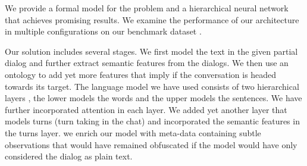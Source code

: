 
We provide a formal model for the problem and a hierarchical neural network 
that achieves promising results. 
We examine the performance of our architecture 
in multiple configurations on our benchmark dataset \cite{frames}. 

Our solution includes several stages. 
We first model the text in the given partial dialog and further extract semantic features from the dialogs. 
We then use an ontology to add yet more features that imply if the conversation 
is headed towards its target. 
The language model we have used consists of two hierarchical layers \cite{attention}, the lower 
models the words and the upper models the sentences. We have further 
incorporated attention \cite{BahdanauCB14} in each layer. 
We added yet another layer that models turns (turn taking in the chat) and
incorporated the semantic features in the turns layer.
we enrich our model with meta-data containing subtle observations 
that would have remained obfuscated if the model would have only considered the dialog as plain text. 



